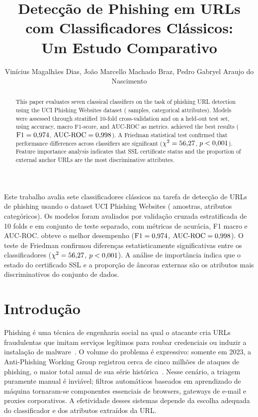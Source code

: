 \documentclass[12pt]{article}
\title{Detecção de Phishing em URLs com Classificadores Clássicos:\\
       Um Estudo Comparativo}
\author{Vinícius Magalhães Dias\inst{1}, João Marcello Machado Braz\inst{1},
        Pedro Gabryel Araujo do Nascimento\inst{1}}
\begin{document}
\maketitle

\begin{abstract}
This paper evaluates seven classical classifiers on the task of phishing URL
detection using the UCI Phishing Websites dataset (\nTotal{} samples,
\nFeatures{} categorical attributes). Models were assessed through stratified
10-fold cross-validation and on a held-out test set, using accuracy, macro
F1-score, and AUC-ROC as metrics. \melhorModelo{} achieved the best results
($\text{F1} = 0{,}974{}$, $\text{AUC-ROC} = 0{,}998{}$).
A Friedman statistical test confirmed that performance differences across
classifiers are significant ($\chi^{2} = 56{,}27{}$,
$p < 0{,}001{}$). Feature importance analysis indicates that SSL certificate
status and the proportion of external anchor URLs are the most
discriminative attributes.
\end{abstract}

\begin{resumo}
Este trabalho avalia sete classificadores clássicos na tarefa de detecção de
URLs de phishing usando o dataset UCI Phishing Websites (\nTotal{} amostras,
\nFeatures{} atributos categóricos). Os modelos foram avaliados por validação
cruzada estratificada de 10 folds e em conjunto de teste separado, com métricas
de acurácia, F1 macro e AUC-ROC. \melhorModelo{} obteve o melhor desempenho
($\text{F1} = 0{,}974{}$, $\text{AUC-ROC} = 0{,}998{}$).
O teste de Friedman confirmou diferenças estatisticamente significativas entre
os classificadores ($\chi^{2} = 56{,}27{}$, $p < 0{,}001{}$). A análise
de importância indica que o estado do certificado SSL e a proporção de âncoras
externas são os atributos mais discriminativos do conjunto de dados.
\end{resumo}

\section{Introdução}

Phishing é uma técnica de engenharia social na qual o atacante cria URLs
fraudulentas que imitam serviços legítimos para roubar credenciais ou induzir
a instalação de malware~\cite{verma2017}. O volume do problema é expressivo:
somente em 2023, a Anti-Phishing Working Group registrou cerca de cinco milhões
de ataques de phishing, o maior total anual de sua série histórica~\cite{apwg2023}.
Nesse cenário, a triagem puramente manual é inviável; filtros
automáticos baseados em aprendizado de máquina tornaram-se componentes
essenciais de browsers, gateways de e-mail e proxies corporativos. A
efetividade desses sistemas depende da escolha adequada do classificador e
dos atributos extraídos da URL.
\end{document}
